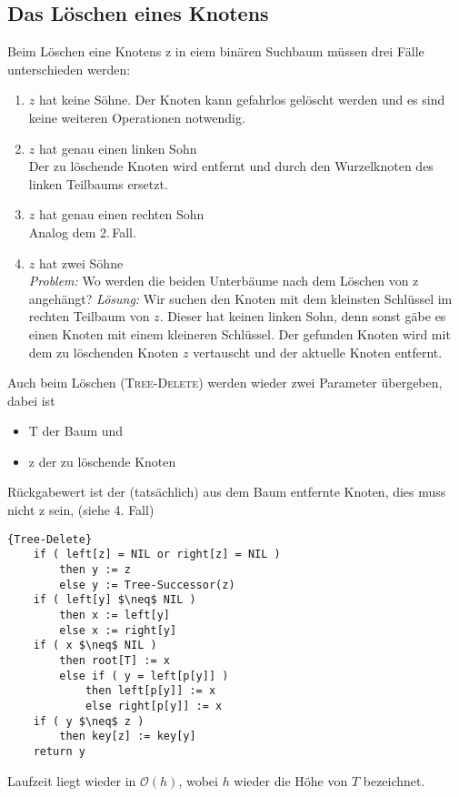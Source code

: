 \documentclass[ngerman,draft,parskip=half*,twoside]{scrreprt}
\theoremstyle{break}
\theoremstyle{nonumberbreak}
\newcommand*{\OO}{\mathcal{O}}      %
\begin{document}
\subsection{Das Löschen eines Knotens}
Beim Löschen eine Knotens z in eiem binären Suchbaum müssen drei Fälle
unterschieden werden:
\begin{enumerate}[1.\,F{a}ll]
\item $z$ hat keine Söhne.
  Der Knoten kann gefahrlos gelöscht werden und es sind
  keine weiteren Operationen notwendig.
  
	 	 
\item $z$ hat genau einen linken Sohn \\
  Der zu löschende Knoten wird entfernt und durch den Wurzelknoten
  des linken Teilbaums ersetzt.
  
	 	
\item $z$ hat genau einen rechten Sohn \\
  Analog dem 2.\,Fall.

\item $z$ hat zwei Söhne \\
  \textit{Problem:} Wo werden die beiden Unterbäume nach dem Löschen von z
  angehängt?
  \textit{Lösung:} Wir suchen den Knoten mit dem kleinsten Schlüssel im rechten
  Teilbaum von $z$. Dieser hat keinen linken Sohn, denn sonst gäbe es einen
  Knoten mit einem kleineren Schlüssel. Der gefunden Knoten wird mit dem
  zu löschenden Knoten $z$ vertauscht und der aktuelle Knoten entfernt.
  
  
\end{enumerate}		 		

		Auch beim Löschen (\textsc{Tree-Delete}) werden wieder zwei Parameter übergeben, dabei ist
		\begin{itemize}
			\item T der Baum und
		 	\item z der zu löschende Knoten
		\end{itemize}
		Rückgabewert ist der (tatsächlich) aus dem Baum entfernte Knoten, dies muss nicht z sein, (siehe 4. Fall)
		\begin{Algorithmus}
                        \begin{lstlisting}[frame=tlrb, mathescape=true, title=\textsc{Tree-Delete}, gobble=4]{Tree-Delete}
	if ( left[z] = NIL or right[z] = NIL )
		then y := z
		else y := Tree-Successor(z)
	if ( left[y] $\neq$ NIL )
		then x := left[y]
		else x := right[y]
	if ( x $\neq$ NIL )
		then root[T] := x
		else if ( y = left[p[y]] )
			then left[p[y]] := x
			else right[p[y]] := x
	if ( y $\neq$ z )
		then key[z] := key[y]
	return y
			\end{lstlisting}

		Laufzeit liegt wieder in $\OO(h)$, wobei  $h$ wieder die Höhe von $T$ bezeichnet.
		\end{Algorithmus}		
\end{document}
